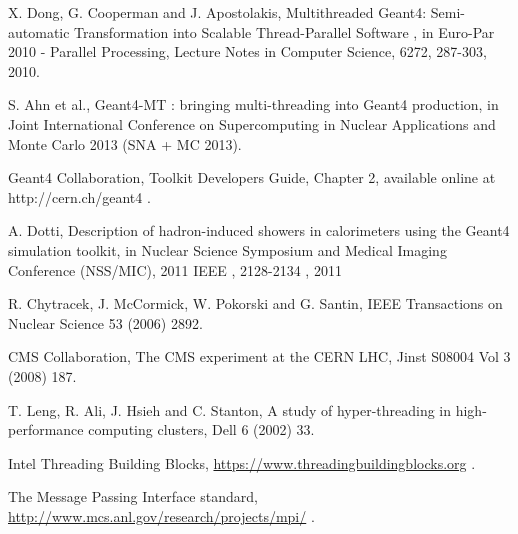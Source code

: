 
 X. Dong, G. Cooperman and J. Apostolakis, Multithreaded Geant4:
                   Semi-automatic Transformation into Scalable Thread-Parallel 
                   Software , in Euro-Par 2010 - Parallel Processing,
                   Lecture Notes in Computer Science, 6272, 287-303, 2010.

 S. Ahn et al., Geant4-MT : bringing multi-threading into Geant4 production,
                     in Joint International Conference on Supercomputing in Nuclear Applications
                     and Monte Carlo 2013 (SNA + MC 2013).

 Geant4 Collaboration, Toolkit Developers Guide, Chapter 2,
                 available online at http://cern.ch/geant4 .

 A. Dotti, Description of hadron-induced showers in calorimeters
                     using the Geant4 simulation toolkit, 
                     in Nuclear Science Symposium and Medical Imaging Conference
                     (NSS/MIC), 2011 IEEE , 2128-2134 , 2011

 R. Chytracek, J. McCormick, W. Pokorski and G. Santin,
                  IEEE Transactions on Nuclear Science 53 (2006) 2892.

 CMS Collaboration, The CMS experiment at the CERN LHC,
                                  Jinst S08004 Vol 3 (2008) 187.

 T. Leng, R. Ali, J. Hsieh and C. Stanton,
                           A study of hyper-threading in high-performance computing clusters,
                           Dell 6 (2002) 33.

 Intel Threading Building Blocks, 
                 \url{https://www.threadingbuildingblocks.org} .

 The Message Passing Interface standard, 
                 \url{http://www.mcs.anl.gov/research/projects/mpi/} .

